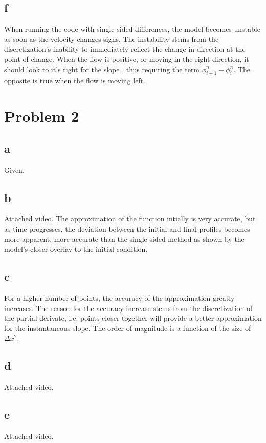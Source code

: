 \documentclass{article}
\begin{document}
\subsection{f}
When running the code with single-sided differences, the model becomes unstable as soon as the velocity changes signs. The instability stems from the discretization's inability to immediately reflect the change in direction at the point of change. When the flow is positive, or moving in the right direction, it should look to it's right for the slope , thus requiring the term $\phi^n_{i+1} - \phi^n_{i}$. The opposite is true when the flow is moving left.


\section{Problem 2}
\subsection{a}
Given.

\subsection{b}
Attached video.
The approximation of the function intially is very accurate, but as time progresses, the deviation between the initial and final profiles becomes more apparent, more accurate than the single-sided method as shown by the model's closer overlay to the initial condition.

\subsection{c}
For a higher number of points, the accuracy of the approximation greatly increases. The reason for the accuracy increase stems from the discretization of the partial derivate, i.e. points closer together will provide a better approximation for the instantaneous slope. The order of magnitude is a function of the size of $\Delta x^2$.

\subsection{d}
Attached video.

\subsection{e}
Attached video.
\end{document}
